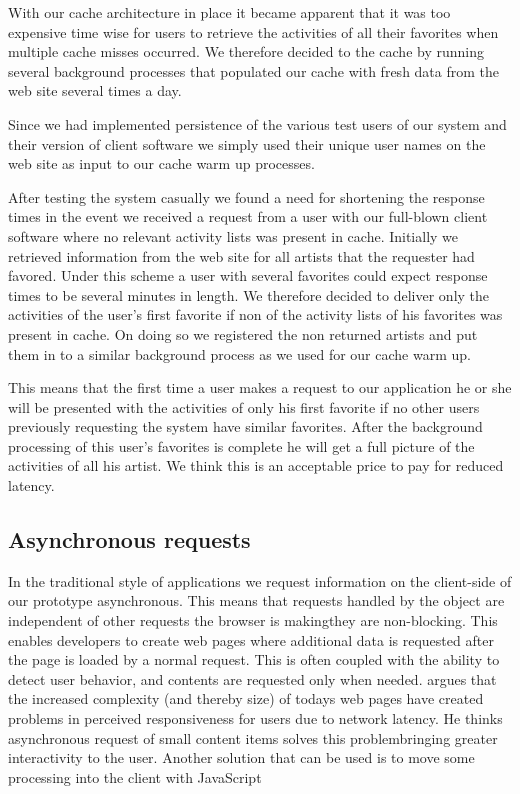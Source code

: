 With our cache architecture in place it became apparent that it was too
expensive time wise for users to retrieve the activities of all their
favorites when multiple cache misses occurred. We therefore decided to
 the cache by running several background processes that populated
our cache with fresh data from the \urort{} web site several times a day.

Since we had implemented persistence of the various test users of our system
and their version of client software we simply used their unique user names
on the \urort{} web site as input to our cache warm up processes.

After testing the system casually we found a need for shortening the response
times in the event we received a request from a user with our full-blown
client software where no relevant activity lists
was present in cache. Initially we retrieved information from the \urort{} web
site for all artists that the requester had favored. Under this scheme a
user with several favorites could expect response times to be several minutes
in length. We therefore decided to deliver only the activities of the user's
first favorite if non of the activity lists of his favorites was present in
cache. On doing so we registered the non returned artists and put them in to a
similar background process as we used for our cache warm up. 

This means that the first time a user makes a request to our application he
or she will be presented with the activities of only his first favorite if no
other users previously requesting the system have similar favorites. After the
background processing of this user's favorites is complete he will get a full
picture of the activities of all his artist. We think this is an acceptable
price to pay for reduced latency.

\subsection{Asynchronous requests}

In the traditional style of  applications we request information on
the client-side of our prototype asynchronous.%
This means that requests handled by the  object
are independent of other requests the browser is making\dash{}they
are non-blocking. This enables developers to create web pages where additional
data is requested after the page is loaded by a normal  request.
This is often coupled with the ability to detect user behavior, and contents
are requested only when needed. \citet[pp.281--282]{stamey06} argues that
the increased complexity (and thereby size) of todays web pages have created
problems in perceived responsiveness for users due to network latency. He
thinks asynchronous request of small content items solves this
problem\dash{}bringing greater interactivity to the user. Another solution
that can be used is to move some processing into the client with
JavaScript \citep[]{jazayeri07}

